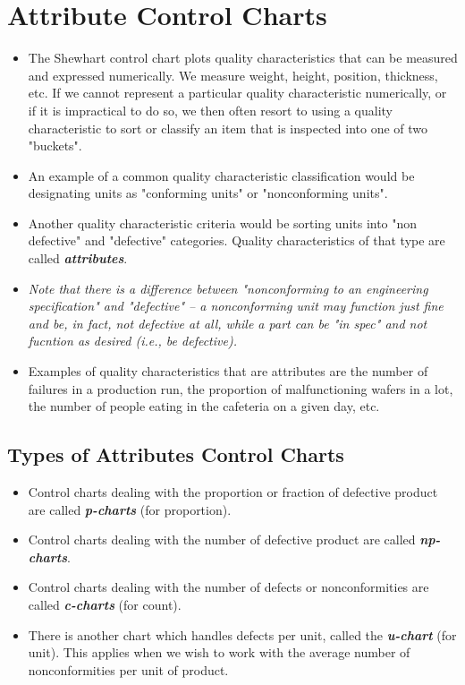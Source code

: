 \documentclass[SPC-MASTER.tex]{subfiles}
\begin{document}
\section{Attribute Control Charts}

\begin{itemize}
\item The Shewhart control chart plots quality characteristics that can be measured and expressed numerically. We measure weight, height, position, thickness, etc. If we cannot represent a particular quality characteristic numerically, or if it is impractical to do so, we then often resort to using a quality characteristic to sort or classify an item that is inspected into one of two "buckets".
\item  An example of a common quality characteristic classification would be designating units as "conforming units" or "nonconforming units". 
\item Another quality characteristic criteria would be sorting units into "non defective" and "defective" categories. Quality characteristics of that type are called \textit{\textbf{attributes}}.

\item \textit{Note that there is a difference between "nonconforming to an engineering specification" and "defective" -- a nonconforming unit may function just fine and be, in fact, not defective at all, while a part can be "in spec" and not fucntion as desired (i.e., be defective).}

\item Examples of quality characteristics that are attributes are the number of failures in a production run, the proportion of malfunctioning wafers in a lot, the number of people eating in the cafeteria on a given day, etc.
\end{itemize}
\subsection{Types of Attributes Control Charts}

\begin{itemize}
\item Control charts dealing with the proportion or fraction of defective product are called  \textbf{\textit{p-charts}} (for proportion).
\item Control charts dealing with the number of defective product are called  \textbf{\textit{np-charts}}.
\item Control charts dealing with the number of defects or nonconformities are called \textbf{\textit{c-charts}} (for count).
\item There is another chart which handles defects per unit, called the \textbf{\textit{u-chart}} (for unit). This applies when we wish to work with the average number of nonconformities per unit of product.
\end{itemize}
\end{document}
